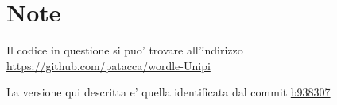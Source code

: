\section{Note}

Il codice in questione si puo' trovare all'indirizzo \url{https://github.com/patacca/wordle-Unipi}

La versione qui descritta e' quella identificata dal commit \href{https://github.com/patacca/wordle-Unipi/commit/b9383070a42909956722c58ba582b070cc9e75a3}{b938307}